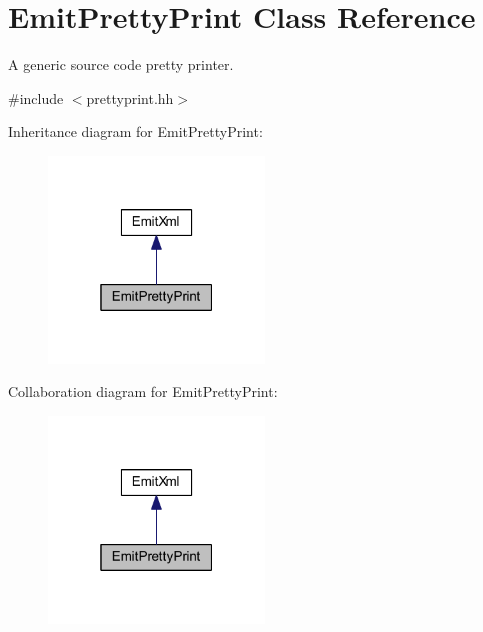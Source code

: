 \hypertarget{class_emit_pretty_print}{}\section{Emit\+Pretty\+Print Class Reference}
\label{class_emit_pretty_print}


A generic source code pretty printer.  




{\ttfamily \#include $<$prettyprint.\+hh$>$}



Inheritance diagram for Emit\+Pretty\+Print\+:
\nopagebreak
\begin{figure}[H]
\begin{center}
\leavevmode
\includegraphics[width=163pt]{class_emit_pretty_print__inherit__graph}
\end{center}
\end{figure}


Collaboration diagram for Emit\+Pretty\+Print\+:
\nopagebreak
\begin{figure}[H]
\begin{center}
\leavevmode
\includegraphics[width=163pt]{class_emit_pretty_print__coll__graph}
\end{center}
\end{figure}
